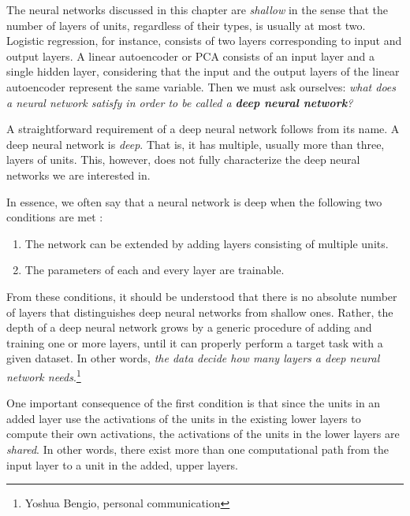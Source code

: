 \documentclass{now}
\begin{document}
The neural networks discussed in this chapter are
\textit{shallow} in the sense that the number of layers of
units, regardless of their types, is usually at most two.
Logistic regression, for instance, consists of two layers
corresponding to input and output layers. A linear
autoencoder or PCA consists of an input layer and a single
hidden layer, considering that the input and the output
layers of the linear autoencoder represent the same
variable. Then we must ask ourselves: \textit{what does a
neural network satisfy in order to be called a \textbf{deep
neural network}?}

A straightforward requirement of a deep neural network
follows from its name. A deep neural network is
\textit{deep}. That is, it has multiple, usually more than
three, layers of units.  This, however, does not fully
characterize the deep neural networks we are interested in.

In essence, we often say that a neural network is deep when
the following two conditions are met \citep[see,
e.g.,][]{Bengio2007a}:
\begin{enumerate}
    \itemsep 0em
    \item The network can be extended by adding layers consisting of multiple units.
    \item The parameters of each and every layer are trainable.
\end{enumerate}

From these conditions, it should be understood that there is
no absolute number of layers that distinguishes deep neural
networks from shallow ones. Rather, the depth of a deep
neural network grows by a generic procedure of adding and
training one or more layers, until it can properly perform a
target task with a given dataset. In other words,
\textit{the data decide how many layers a deep neural
network needs}.\footnote{Yoshua Bengio, personal
communication}

One important consequence of the first condition is that
since the units in an added layer use the activations of the
units in the existing lower layers to compute their own
activations, the activations of the units in the lower
layers are \textit{shared}.  In other words, there exist
more than one computational path from the input layer to a
unit in the added, upper layers.

\end{document}
